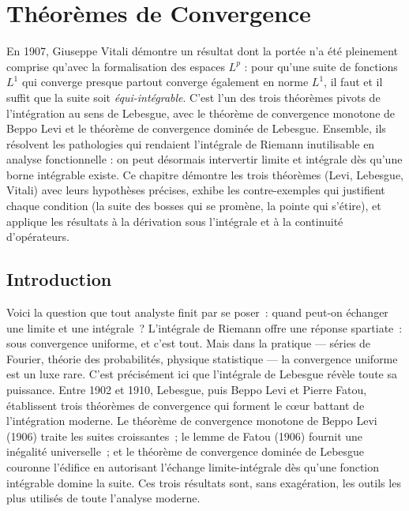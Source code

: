 \chapter{Th\'eor\`emes de Convergence}
\label{ch:convergence}

En 1907, Giuseppe Vitali démontre un résultat dont la portée n'a été pleinement comprise qu'avec la formalisation des espaces $L^p$ : pour qu'une suite de fonctions $L^1$ qui converge presque partout converge également en norme $L^1$, il faut et il suffit que la suite soit \emph{équi-intégrable}. C'est l'un des trois théorèmes pivots de l'intégration au sens de Lebesgue, avec le théorème de convergence monotone de Beppo Levi et le théorème de convergence dominée de Lebesgue. Ensemble, ils résolvent les pathologies qui rendaient l'intégrale de Riemann inutilisable en analyse fonctionnelle : on peut désormais intervertir limite et intégrale dès qu'une borne intégrable existe. Ce chapitre démontre les trois théorèmes (Levi, Lebesgue, Vitali) avec leurs hypothèses précises, exhibe les contre-exemples qui justifient chaque condition (la suite des bosses qui se promène, la pointe qui s'étire), et applique les résultats à la dérivation sous l'intégrale et à la continuité d'opérateurs.

\section{Introduction}

Voici la question que tout analyste finit par se poser~: quand peut-on \'echanger une limite et une int\'egrale~? L'int\'egrale de Riemann offre une r\'eponse spartiate~: sous convergence uniforme, et c'est tout. Mais dans la pratique --- s\'eries de Fourier, th\'eorie des probabilit\'es, physique statistique --- la convergence uniforme est un luxe rare. C'est pr\'ecis\'ement ici que l'int\'egrale de Lebesgue r\'ev\`ele toute sa puissance. Entre 1902 et 1910, Lebesgue, puis Beppo Levi et Pierre Fatou, \'etablissent trois th\'eor\`emes de convergence qui forment le c\oe ur battant de l'int\'egration moderne. Le th\'eor\`eme de convergence monotone de Beppo Levi (1906) traite les suites croissantes~; le lemme de Fatou (1906) fournit une in\'egalit\'e universelle~; et le th\'eor\`eme de convergence domin\'ee de Lebesgue couronne l'\'edifice en autorisant l'\'echange limite-int\'egrale d\`es qu'une fonction int\'egrable \og domine \fg{} la suite. Ces trois r\'esultats sont, sans exag\'eration, les outils les plus utilis\'es de toute l'analyse moderne.

